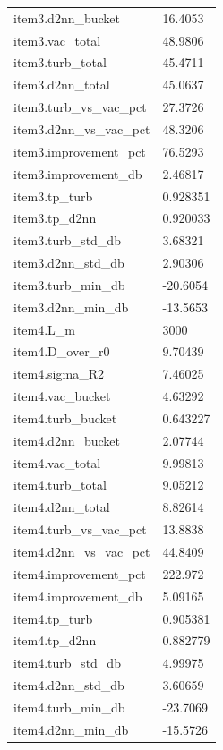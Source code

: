 \begin{longtable}{p{}p{}}
item3.d2nn\_bucket & 16.4053\\
item3.vac\_total & 48.9806\\
item3.turb\_total & 45.4711\\
item3.d2nn\_total & 45.0637\\
item3.turb\_vs\_vac\_pct & 27.3726\\
item3.d2nn\_vs\_vac\_pct & 48.3206\\
item3.improvement\_pct & 76.5293\\
item3.improvement\_db & 2.46817\\
item3.tp\_turb & 0.928351\\
item3.tp\_d2nn & 0.920033\\
item3.turb\_std\_db & 3.68321\\
item3.d2nn\_std\_db & 2.90306\\
item3.turb\_min\_db & -20.6054\\
item3.d2nn\_min\_db & -13.5653\\
item4.L\_m & 3000\\
item4.D\_over\_r0 & 9.70439\\
item4.sigma\_R2 & 7.46025\\
item4.vac\_bucket & 4.63292\\
item4.turb\_bucket & 0.643227\\
item4.d2nn\_bucket & 2.07744\\
item4.vac\_total & 9.99813\\
item4.turb\_total & 9.05212\\
item4.d2nn\_total & 8.82614\\
item4.turb\_vs\_vac\_pct & 13.8838\\
item4.d2nn\_vs\_vac\_pct & 44.8409\\
item4.improvement\_pct & 222.972\\
item4.improvement\_db & 5.09165\\
item4.tp\_turb & 0.905381\\
item4.tp\_d2nn & 0.882779\\
item4.turb\_std\_db & 4.99975\\
item4.d2nn\_std\_db & 3.60659\\
item4.turb\_min\_db & -23.7069\\
item4.d2nn\_min\_db & -15.5726\\
\end{longtable}


